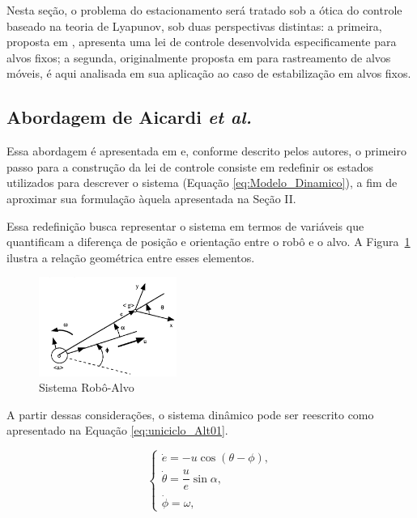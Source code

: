 \documentclass[conference]{IEEEtran}
\begin{document}
Nesta seção, o problema do estacionamento será tratado sob a ótica do controle baseado na teoria de Lyapunov, sob duas perspectivas distintas: a primeira, proposta em \cite{b1}, apresenta uma lei de controle desenvolvida especificamente para alvos fixos; a segunda, originalmente proposta em \cite{b2} para rastreamento de alvos móveis, é aqui analisada em sua aplicação ao caso de estabilização em alvos fixos.


\subsection{Abordagem de Aicardi \textit{et al.}}

Essa abordagem é apresentada em \cite{b1} e, conforme descrito pelos autores, o primeiro passo para a construção da lei de controle consiste em redefinir os estados utilizados para descrever o sistema (Equação \ref{eq:Modelo_Dinamico}), a fim de aproximar sua formulação àquela apresentada na Seção II.

Essa redefinição busca representar o sistema em termos de variáveis que quantificam a diferença de posição e orientação entre o robô e o alvo. A Figura~\ref{fig:Sistema_Robo_Alvo} ilustra a relação geométrica entre esses elementos.

\begin{figure}[h!]
    \centering
    \includegraphics[width=0.4\textwidth]{Figuras/Sistema_Robo_Alvo.png}
    \caption{Sistema Robô-Alvo}
    \label{fig:Sistema_Robo_Alvo}
\end{figure}

A partir dessas considerações, o sistema dinâmico pode ser reescrito como apresentado na Equação \ref{eq:uniciclo_Alt01}.

\begin{equation}
    \begin{cases}
        \dot{e} = -u \cos(\theta - \phi), \\
        \dot{\theta} = \dfrac{u}{e} \sin \alpha, \\
        \dot{\phi} = \omega,
    \end{cases}
    \label{eq:uniciclo_Alt01}
\end{equation}
\end{document}
